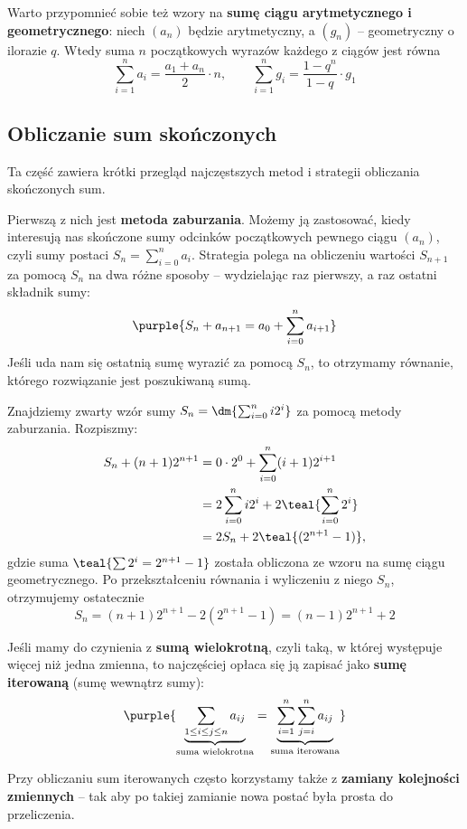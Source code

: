 Warto przypomnieć sobie też wzory na \textbf{sumę ciągu arytmetycznego i geometrycznego}: niech $(a_n)$ będzie arytmetyczny, a $(g_n)$ -- geometryczny o ilorazie $q$. Wtedy suma $n$ początkowych wyrazów każdego z ciągów jest równa
$$\sum_{i = 1}^n a_i = \frac{a_1 + a_n}{2} \cdot n, \qquad \sum_{i = 1}^n g_i = \frac{1 - q^n}{1 - q} \cdot g_1$$

\subsection{Obliczanie sum skończonych}
Ta część zawiera krótki przegląd najczęstszych metod i strategii obliczania skończonych sum.

Pierwszą z nich jest \textbf{metoda zaburzania}. Możemy ją zastosować, kiedy interesują nas skończone sumy odcinków początkowych pewnego ciągu $(a_n)$, czyli sumy postaci $S_n = \sum_{i = 0}^n a_i$. Strategia polega na obliczeniu wartości $S_{n + 1}$ za pomocą $S_n$ na dwa różne sposoby -- wydzielając raz pierwszy, a raz ostatni składnik sumy:
$$\purple{S_n + a_{n + 1} = a_0 + \sum_{i = 0}^n a_{i + 1}}$$
Jeśli uda nam się ostatnią sumę wyrazić za pomocą $S_n$, to otrzymamy równanie, którego rozwiązanie jest poszukiwaną sumą.

\begin{example}
    Znajdziemy zwarty wzór sumy $S_n = \dm{\sum_{i = 0}^n i2^i}$ za pomocą metody zaburzania. Rozpiszmy:
    \begin{align*}
        S_n + (n + 1)2^{n + 1} &= 0 \cdot 2^0 + \sum_{i = 0}^n (i + 1)2^{i + 1} \\
        &= 2 \sum_{i = 0}^n i2^i + 2 \teal{\sum_{i = 0}^n 2^i} \\
        &= 2S_n + 2\teal{(2^{n + 1} - 1)},
    \end{align*}
    gdzie suma $\teal{\sum 2^i = 2^{n + 1} - 1}$ została obliczona ze wzoru na sumę ciągu geometrycznego. Po przekształceniu równania i wyliczeniu z niego $S_n$, otrzymujemy ostatecznie
    $$S_n = (n + 1)2^{n + 1} - 2(2^{n + 1} - 1) = (n - 1)2^{n + 1} + 2$$
\end{example}

Jeśli mamy do czynienia z \textbf{sumą wielokrotną}, czyli taką, w której występuje więcej niż jedna zmienna, to najczęściej opłaca się ją zapisać jako \textbf{sumę iterowaną} (sumę wewnątrz sumy):
$$\purple{\underbrace{\sum_{1 \leq i \leq j \leq n} a_{ij}}_{\text{suma wielokrotna}} = \underbrace{\sum_{i = 1}^n \sum_{j = i}^n a_{ij}}_{\text{suma iterowana}}}$$

Przy obliczaniu sum iterowanych często korzystamy także z \textbf{zamiany kolejności zmiennych} -- tak aby po takiej zamianie nowa postać była prosta do przeliczenia.

